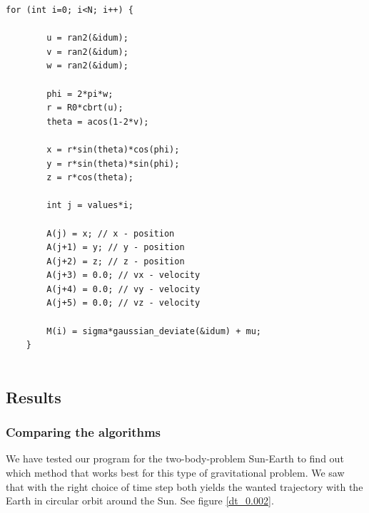 \documentclass[a4paper,12pt, english]{article}
\begin{document}
\begin{lstlisting}[title={Initial conditions for the N-body system}]
    for (int i=0; i<N; i++) {

        u = ran2(&idum);
        v = ran2(&idum);
        w = ran2(&idum);

        phi = 2*pi*w;
        r = R0*cbrt(u);
        theta = acos(1-2*v);

        x = r*sin(theta)*cos(phi);
        y = r*sin(theta)*sin(phi);
        z = r*cos(theta);

        int j = values*i;

        A(j) = x; // x - position
        A(j+1) = y; // y - position
        A(j+2) = z; // z - position
        A(j+3) = 0.0; // vx - velocity
        A(j+4) = 0.0; // vy - velocity
        A(j+5) = 0.0; // vz - velocity

        M(i) = sigma*gaussian_deviate(&idum) + mu;
    }
  
\end{lstlisting}

 
\subsection*{Results}

\subsubsection*{Comparing the algorithms}

We have tested our program for the two-body-problem Sun-Earth to find out which method that works best for this type of gravitational problem. We saw that with the right choice of time step both yields the wanted trajectory with the Earth in circular orbit around the Sun. See figure \ref{dt_0.002}.
\end{document}
